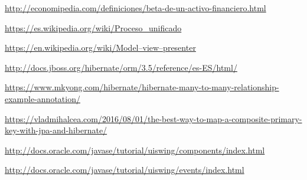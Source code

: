 \documentclass[12pt, a4paper]{book}
\begin{document}
\begin{thebibliography}{10}
	\bibitem[Economipedia]{}
	\newline
	\href{http://economipedia.com/definiciones/beta-de-un-activo-financiero.html}{http://economipedia.com/definiciones/beta-de-un-activo-financiero.html}
	
	\bibitem[Wikipedia]{}
	\newline
	\href{https://es.wikipedia.org/wiki/Proceso\_unificado}{https://es.wikipedia.org/wiki/Proceso\_unificado}
	
	\bibitem[Wikipedia]{}
	\newline
	\href{https://en.wikipedia.org/wiki/Model–view–presenter}{https://en.wikipedia.org/wiki/Model–view–presenter}
	
	\bibitem[Jboss]{}
	\newline
	\href{http://docs.jboss.org/hibernate/orm/3.5/reference/es-ES/html/}{http://docs.jboss.org/hibernate/orm/3.5/reference/es-ES/html/}
	
	\newpage
	
	\bibitem[Mkyong]{}
	\newline
	\href{https://www.mkyong.com/hibernate/hibernate-many-to-many-relationship-example-annotation/}{https://www.mkyong.com/hibernate/hibernate-many-to-many-relationship-example-annotation/}
	
	
	
	\bibitem[Vladmihalcea]{}
	\newline
	\href{https://vladmihalcea.com/2016/08/01/the-best-way-to-map-a-composite-primary-key-with-jpa-and-hibernate/}{https://vladmihalcea.com/2016/08/01/the-best-way-to-map-a-composite-primary-key-with-jpa-and-hibernate/}
	
	\bibitem[Oracle]{}
	\newline
	\href{http://docs.oracle.com/javase/tutorial/uiswing/components/index.html}{http://docs.oracle.com/javase/tutorial/uiswing/components/index.html}
	
	\bibitem[Oracle]{}
	\newline
	\href{http://docs.oracle.com/javase/tutorial/uiswing/events/index.html}{http://docs.oracle.com/javase/tutorial/uiswing/events/index.html}
	

\end{thebibliography}
\end{document}

